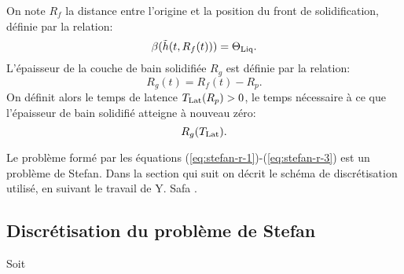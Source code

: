 On note $R_f$ la distance entre l'origine et la position du front de
solidification, définie par la relation:
\begin{equation}
\beta(\tilde{h}(t, R_f(t))) = \Theta_\text{Liq}.
\end{equation}
L'épaisseur de la couche de bain solidifiée $R_g$ est définie par la
relation:
\begin{equation}
R_g(t) = R_f(t) - R_p.
\end{equation}
On définit alors le temps de latence $T_\text{Lat}(R_p) > 0$, le temps
nécessaire à ce que l'épaisseur de bain solidifié atteigne à
nouveau zéro:
\begin{equation}
  R_g(T_\text{Lat}).
\end{equation}

Le problème formé par les équations
(\ref{eq:stefan-r-1})-(\ref{eq:stefan-r-3}) est un problème de
Stefan. Dans la section qui suit on décrit le schéma de discrétisation
utilisé, en suivant le travail de Y. Safa \cite{Safa2005}.


\subsection*{Discrétisation du problème de Stefan}
Soit

